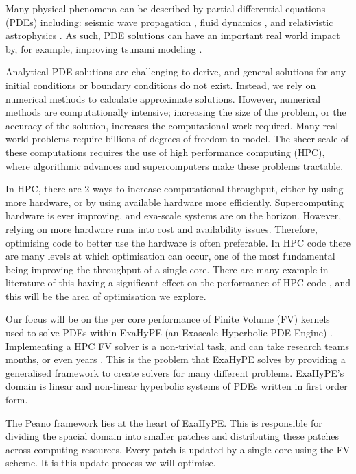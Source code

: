 Many physical phenomena can be described by partial differential equations (PDEs) including:  seismic wave propagation \cite{earthquakePDE}, fluid dynamics \cite{exahype}, and relativistic astrophysics \cite{relativisticPDE}.
As such, PDE solutions can have an important real world impact by, for example, improving tsunami modeling \cite{tsunamiPDE}.


Analytical PDE solutions are challenging to derive, and general solutions for any initial conditions or boundary conditions do not exist.
Instead, we rely on numerical methods to calculate approximate solutions.
However, numerical methods are computationally intensive; increasing the size of the problem, or the accuracy of the solution, increases the computational work required.
Many real world problems require billions of degrees of freedom to model.
The sheer scale of these computations requires the use of high performance computing (HPC), where algorithmic advances and supercomputers make these problems tractable.

In HPC, there are 2 ways to increase computational throughput, either by using more hardware, or by using available hardware more efficiently.
Supercomputing hardware is ever improving, and exa-scale systems are on the horizon.
However, relying on more hardware runs into cost and availability issues.
Therefore, optimising code to better use the hardware is often preferable.
In HPC code there are many levels at which optimisation can occur, one of the most fundamental being improving the throughput of a single core.
There are many example in literature of this having a significant effect on the performance of HPC code \cite{YATeTo,seisolPFLOP,codegen_dg_SIMD}, and this will be the area of optimisation we explore.     

Our focus will be on the per core performance of Finite Volume (FV) kernels used to solve PDEs within ExaHyPE (an Exascale Hyperbolic PDE Engine) \cite{exahype}.
Implementing a HPC FV solver is a non-trivial task, and can take research teams months, or even years \cite{tensorChemistry}.
This is the problem that ExaHyPE solves by providing a generalised framework to create solvers for many different problems.
ExaHyPE's domain is linear and non-linear hyperbolic systems of PDEs written in first order form.

The Peano framework \cite{PeanoFramework} lies at the heart of ExaHyPE.
This is responsible for dividing the spacial domain into smaller patches and distributing these patches across computing resources.
Every patch is updated by a single core using the FV scheme.
It is this update process we will optimise.

